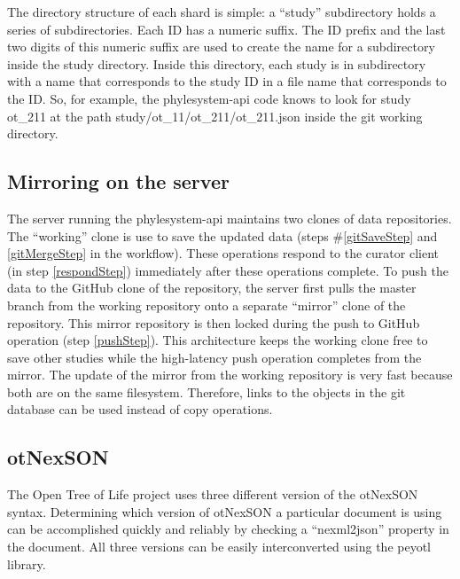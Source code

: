 \documentclass{bioinfo}
\newcommand{\ps}{phylesystem\xspace}
\newcommand{\otol}{Open Tree of Life\xspace}
\newcommand{\nexson}{otNexSON\xspace}
\begin{document}
\begin{methods}
The directory structure of each shard is simple: a ``study'' subdirectory holds 
a series of subdirectories.
Each ID has a numeric suffix.
The ID prefix and the last two digits of this numeric suffix are used to create the name
    for a subdirectory inside the study directory.
Inside this directory, each study is in subdirectory with a name that corresponds to the study ID
    in a file name that corresponds to the ID.
So, for example, the \ps-api code knows to look for study ot\_211 at the path
    study/ot\_11/ot\_211/ot\_211.json inside the git working directory.
\subsection*{Mirroring on the server}
The server running the \ps-api maintains two clones of data repositories.
The ``working'' clone is use to save the updated data (steps \#\ref{gitSaveStep} and \ref{gitMergeStep}  in the workflow).
These operations respond to the curator client (in step \ref{respondStep}) immediately
    after these operations complete.
To push the data to the GitHub clone of the repository, the server first pulls the master branch from the working repository onto a separate
    ``mirror'' clone of the repository.
This mirror repository is then locked during the push to GitHub operation (step \ref{pushStep}).
This architecture keeps the working clone free to save other studies while the high-latency push operation completes from the mirror.
The update of the mirror from the working repository is very fast because both are on the same filesystem.
Therefore, links to the objects in the git database can be used instead of copy operations.

\subsection*{\nexson}
The \otol project uses three different version of the \nexson syntax.
Determining which version of \nexson a particular document is using
    can be accomplished quickly and reliably by checking a  ``nexml2json'' property in the document.
All three versions can be easily interconverted using the peyotl library.


\end{methods}
\end{document}
